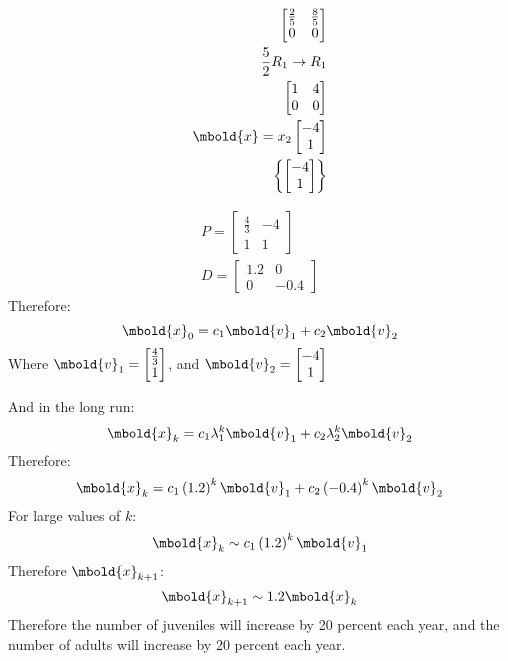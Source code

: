 \documentclass[12pt letter]{report}
\begin{document}
{\begin{enumerate}
\begin{align*}
\begin{bmatrix}
              \frac{2}{5} & \frac{8}{5} \\
              0           & 0           \\
            \end{bmatrix}
            \\
            \frac{5}{2}R_1 \to R_1                                                   \\
            \begin{bmatrix}
              1 & 4 \\
              0 & 0 \\
            \end{bmatrix}
            \\
            \mbold{x} = x_2 \begin{bmatrix} - 4\\ 1 \end{bmatrix}                    \\
            \left\{ \begin{bmatrix} - 4\\ 1 \end{bmatrix} \right\}
          \end{align*}

          \begin{align*}
            P = \begin{bmatrix} \frac{4}{3} &-4 \\ 1 & 1 \end{bmatrix} \\
            D = \begin{bmatrix} 1.2 & 0 \\ 0 & -0.4 \end{bmatrix}
          \end{align*}
          Therefore:
          \[
            \mbold{x}_0 = c_1 \mbold{v}_1 + c_2 \mbold{v}_2
          \]
          Where $\mbold{v}_1 = \begin{bmatrix} \frac{4}{3} \\ 1 \end{bmatrix} $, and $\mbold{v}_2 = \begin{bmatrix} -4
              \\ 1\end{bmatrix} $

          \noindent And in the long run:
          \[
            \mbold{x}_k = c_1 \lambda_1^{k} \mbold{v}_1 + c_2 \lambda_2^{k}\mbold{v}_2
          \]
          Therefore:
          \[
            \mbold{x}_k = c_1 \left( 1.2 \right)^{k}\mbold{v}_1 + c_2 \left( -0.4 \right) ^{k} \mbold{v}_2
          \]
          For large values of $k$:
          \[
            \mbold{x}_k \sim c_1 \left( 1.2 \right)^{k} \mbold{v}_1
          \]
          Therefore $\mbold{x}_{k+1}$:
          \[
            \mbold{x}_{k+1} \sim 1.2 \mbold{x}_k
          \]
          Therefore the number of juveniles will increase by 20 percent each year, and the number of adults will increase by 20 percent each year.


  \end{enumerate}


}
\end{document}

